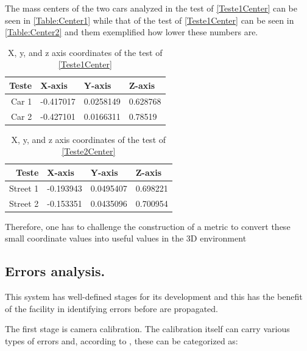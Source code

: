     The mass centers of the two cars analyzed in the test of \autoref{Teste1Center} can be seen in \autoref{Table:Center1} while that of the test of \autoref{Teste1Center} can be seen in \autoref{Table:Center2} and them exemplified how lower these numbers are.
    
    \begin{table}[H]
    \centering
    \caption{X, y, and z axis coordinates of the test of \autoref{Teste1Center}}
    \label{Table:Center1}
    \begin{tabular}{r|lll}
    Teste & X-axis & Y-axis & Z-axis \\ 
    \hline                               
    Car 1 & -0.417017   & 0.0258149 & 0.628768 \\
    Car 2 & -0.427101   & 0.0166311 & 0.78519       
     
    \end{tabular}
    \end{table}

    \begin{table}[H]
    \centering
    \caption{X, y, and z axis coordinates of the test of \autoref{Teste2Center}}
    \label{Table:Center2}
    \begin{tabular}{r|lll}
    Teste & X-axis & Y-axis & Z-axis \\ 
    \hline                              
    Street 1 & -0.193943   & 0.0495407 & 0.698221 \\
    Street 2 & -0.153351   & 0.0435096 & 0.700954   
     
    \end{tabular}
    \end{table}

    Therefore, one has to challenge the construction of a metric to convert these small coordinate values ​​into useful values ​​in the 3D environment
    
\subsection{Errors analysis.}

    This system has well-defined stages for its development and this has the benefit of the facility in identifying errors before are propagated.
    
    The first stage is camera calibration. The calibration itself can carry various types of errors and, according to \cite{ErrosCalibracao}, these can be categorized as:
    
